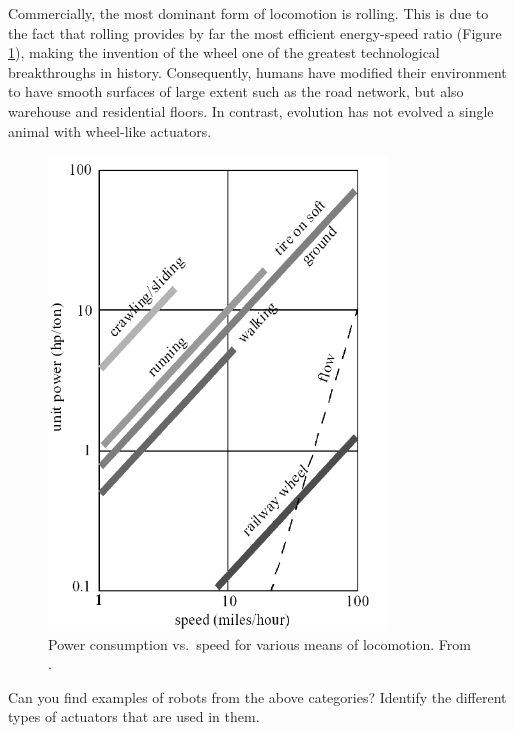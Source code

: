 Commercially, the most dominant form of locomotion is rolling. This is due to the fact that rolling provides by far the most efficient energy-speed ratio (Figure \ref{fig:todd}), making the invention of the wheel one of the greatest technological breakthroughs in history. Consequently, humans have modified their environment to have smooth surfaces of large extent such as the road network, but also warehouse and residential floors. In contrast, evolution has not evolved a single animal with wheel-like actuators.

\begin{figure}
	\centering
		\includegraphics[width=0.8\textwidth]{figs/todd85.png}
	\caption{Power consumption vs.\ speed for various means of locomotion. From \protect{}.}
	\label{fig:todd}
\end{figure}


\begin{framed}Can you find examples of robots from the above categories? Identify the different types of actuators that are used in them.
\end{framed}

